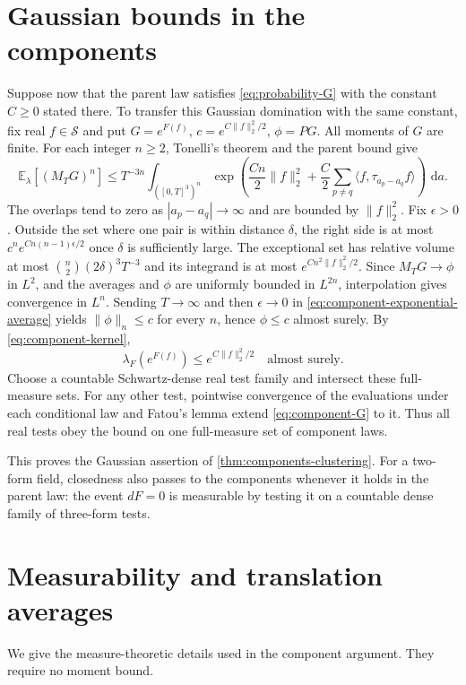 \documentclass[11pt,letterpaper,reqno]{amsart}
\newcommand{\E}{\mathbb E}
\newcommand{\dd}{\,\mathrm d}
\newcommand{\Sspace}{\mathcal S}
\begin{document}
\section{Gaussian bounds in the components}\label{sec:component-gaussian}
Suppose now that the parent law satisfies
\eqref{eq:probability-G} with the constant $C\ge0$ stated there. To transfer this Gaussian domination with
the same constant, fix real
$f\in\Sspace$ and put $G=e^{F(f)}$, $c=e^{C\|f\|_2^2/2}$,
$\phi=PG$. All moments of $G$ are finite. For each integer $n\ge2$,
Tonelli's theorem and the parent bound give
\begin{equation}\label{eq:component-exponential-average}
 \E_\lambda[(M_TG)^n]\le T^{-3n}
 \int_{([0,T]^3)^n}
 \exp\left(\frac {Cn}2\|f\|_2^2+
       \frac C2\sum_{p\ne q}\langle f,\tau_{a_p-a_q}f\rangle\right)\,\dd a.
\end{equation}
The overlaps tend to zero as $|a_p-a_q|\to\infty$ and are bounded
by $\|f\|_2^2$. Fix $\epsilon>0$. Outside the set where one pair is within distance
$\delta$, the right side is at most
$c^n e^{Cn(n-1)\epsilon/2}$ once $\delta$ is sufficiently large.
The exceptional set has relative volume at most
$\binom n2(2\delta)^3T^{-3}$ and its integrand is at most
$e^{Cn^2\|f\|_2^2/2}$.
Since $M_TG\to\phi$ in $L^2$, and the averages and $\phi$ are
uniformly bounded in $L^{2n}$, interpolation gives convergence in
$L^n$. Sending $T\to\infty$ and then $\epsilon\to0$ in
\eqref{eq:component-exponential-average} yields
$\|\phi\|_n\le c$ for every $n$, hence $\phi\le c$ almost surely.
By \eqref{eq:component-kernel},
\begin{equation}\label{eq:component-G}
 \lambda_F(e^{F(f)})\le e^{C\|f\|_2^2/2}\quad\text{almost surely}.
\end{equation}
Choose a countable Schwartz-dense real test family and intersect
these full-measure sets. For any other test, pointwise convergence
of the evaluations under each conditional law and Fatou's lemma
extend \eqref{eq:component-G} to it. Thus all real tests obey the
bound on one full-measure set of component laws.

This proves the Gaussian assertion of
\cref{thm:components-clustering}. For a two-form field, closedness
also passes to the components whenever it holds in the parent law:
the event $dF=0$ is measurable by testing it on a countable dense
family of three-form tests.
\appendix
\section{Measurability and translation averages}\label{sec:background}
We give the measure-theoretic details used in the component argument.
They require no moment bound.
\end{document}
